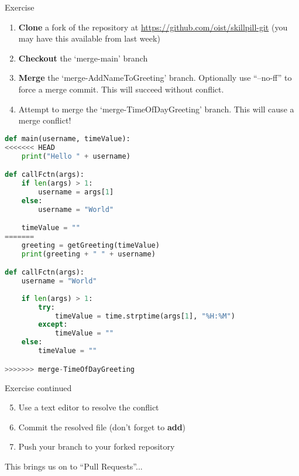 \documentclass{beamer}
\begin{document}
\begin{frame}
  \begin{block}{Exercise}
    \begin{enumerate}
    	\item \textbf{Clone} a fork of the repository at \url{https://github.com/oist/skillpill-git} (you may have this available from last week)
		\item \textbf{Checkout} the `merge-main' branch
		\item \textbf{Merge} the `merge-AddNameToGreeting' branch. Optionally use ``--no-ff'' to force a merge commit. This will succeed without conflict.
		\item Attempt to merge the `merge-TimeOfDayGreeting' branch. This will cause a merge conflict!
	\end{enumerate}
  \end{block}
\end{frame}

\begin{frame}[fragile]
	\begin{lstlisting}[language=Python, title={Merge conflict contents}, basicstyle=\tiny]
def main(username, timeValue):
<<<<<<< HEAD
    print("Hello " + username)

def callFctn(args):
    if len(args) > 1:
        username = args[1]
    else:
        username = "World"

    timeValue = ""
=======
    greeting = getGreeting(timeValue)
    print(greeting + " " + username)

def callFctn(args):
    username = "World"
    
    if len(args) > 1:
        try:
            timeValue = time.strptime(args[1], "%H:%M")
        except:
            timeValue = ""
    else:
        timeValue = ""

>>>>>>> merge-TimeOfDayGreeting
	\end{lstlisting}
\end{frame}

\begin{frame}
  \begin{block}{Exercise continued}
    \begin{enumerate}
    	\setcounter{enumi}{4}
	    \item Use a text editor to resolve the conflict
		\item Commit the resolved file (don't forget to \textbf{add})
		\item Push your branch to your forked repository
	\end{enumerate}
  \end{block}
  This brings us on to ``Pull Requests''...
\end{frame}
\end{document}
